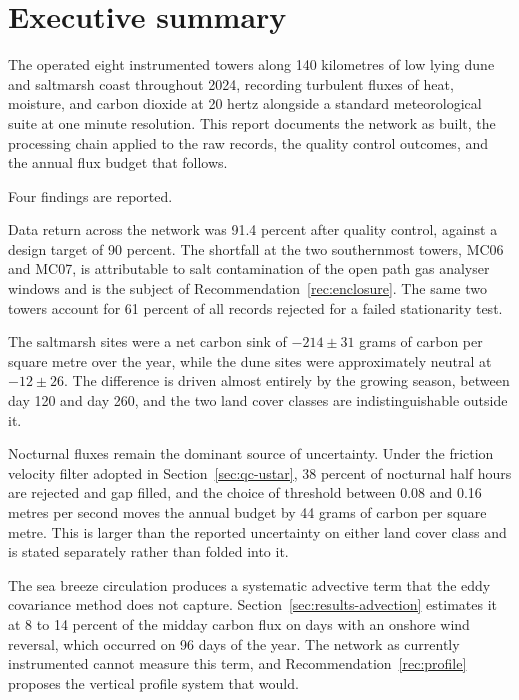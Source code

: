 \section*{Executive summary}

The \network{} operated eight instrumented towers along 140 kilometres of
low lying dune and saltmarsh coast throughout 2024, recording turbulent fluxes
of heat, moisture, and carbon dioxide at 20 hertz alongside a standard
meteorological suite at one minute resolution. This report documents the
network as built, the processing chain applied to the raw records, the quality
control outcomes, and the annual flux budget that follows.

Four findings are reported.

Data return across the network was 91.4 percent after quality control, against
a design target of 90 percent. The shortfall at the two southernmost towers,
MC06 and MC07, is attributable to salt contamination of the open path gas
analyser windows and is the subject of Recommendation~\ref{rec:enclosure}. The
same two towers account for 61 percent of all records rejected for a failed
stationarity test.

The saltmarsh sites were a net carbon sink of $-214 \pm 31$ grams of carbon per
square metre over the year, while the dune sites were approximately neutral at
$-12 \pm 26$. The difference is driven almost entirely by the growing season,
between day 120 and day 260, and the two land cover classes are
indistinguishable outside it.

Nocturnal fluxes remain the dominant source of uncertainty. Under the friction
velocity filter adopted in Section~\ref{sec:qc-ustar}, 38 percent of nocturnal
half hours are rejected and gap filled, and the choice of threshold between
0.08 and 0.16 metres per second moves the annual budget by 44 grams of carbon
per square metre. This is larger than the reported uncertainty on either land
cover class and is stated separately rather than folded into it.

The sea breeze circulation produces a systematic advective term that the eddy
covariance method does not capture. Section~\ref{sec:results-advection}
estimates it at 8 to 14 percent of the midday carbon flux on days with an
onshore wind reversal, which occurred on 96 days of the year. The network as
currently instrumented cannot measure this term, and
Recommendation~\ref{rec:profile} proposes the vertical profile system that
would.
